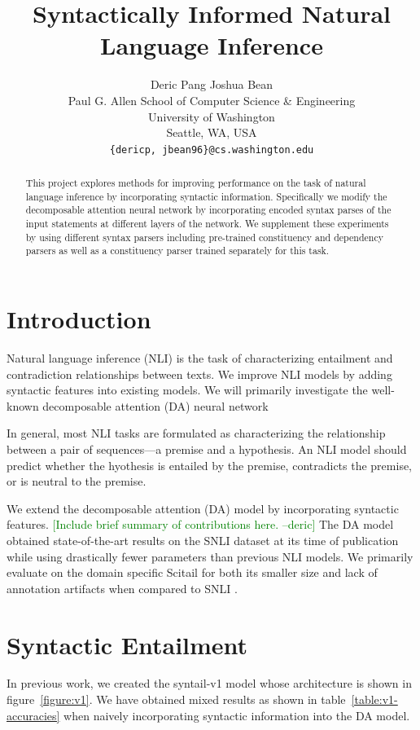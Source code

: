\documentclass[11pt,a4paper]{article}
\title{Syntactically Informed Natural Language Inference}
\author{
  Deric Pang \quad
  Joshua Bean \\
  Paul G. Allen School of Computer Science \& Engineering \\
  University of Washington \\
  Seattle, WA, USA \\
  {\tt \{dericp, jbean96\}@cs.washington.edu} \\
}
\date{}
\newcommand{\dpcomment}[1]{\textcolor{green}{[#1 --deric]}}
\begin{document}
\maketitle
\begin{abstract}
This project explores methods for improving performance on the task of natural language inference by incorporating syntactic information. Specifically we modify the decomposable attention neural network \citep{Parikh2016-em} by incorporating encoded syntax parses of the input statements at different layers of the network. We supplement these experiments by using different syntax parsers including pre-trained constituency and dependency parsers as well as a constituency parser trained separately for this task. 
\end{abstract}

\section{Introduction}

Natural language inference (NLI) is the task of characterizing entailment and
contradiction relationships between texts. We improve NLI models by adding syntactic
features into existing models.
We will primarily investigate the well-known decomposable attention (DA) neural
network \citep{Parikh2016-em}

In general, most NLI tasks are formulated as characterizing the relationship
between a pair of sequences---a premise and a hypothesis. An NLI model should
predict whether the hyothesis is entailed by the premise, contradicts the
premise, or is neutral to the premise.

We extend the decomposable attention (DA) model by \citet{Parikh2016-em}
incorporating syntactic features.
\dpcomment{Include brief summary of contributions here.}
The DA model obtained state-of-the-art results on the
SNLI \citep{Bowman2015-is} dataset at its time of publication while using
drastically fewer parameters than previous NLI models.
We primarily
evaluate on the domain specific Scitail \citep{Khot2018-th} for both its
smaller size and lack of annotation artifacts when compared to SNLI
\citep{Gururangan2018-lj}.

\section{Syntactic Entailment}

In previous work, we created the syntail-v1 model whose architecture is shown
in figure~\ref{figure:v1}.  We have obtained mixed results as shown in
table~\ref{table:v1-accuracies} when naively incorporating syntactic
information into the DA model.
\end{document}
